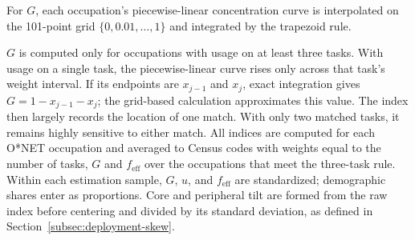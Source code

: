 \documentclass[12pt]{article}
\theoremstyle{plain}
\theoremstyle{definition}
\theoremstyle{remark}
\begin{document}
For $G$, each occupation's piecewise-linear concentration curve is
interpolated on the 101-point grid
$\{0,0.01,\ldots,1\}$ and integrated by the trapezoid rule.

$G$ is computed only for occupations with usage on at least three tasks.
With usage on a single task, the piecewise-linear curve rises only
across that task's weight interval. If its endpoints are $x_{j-1}$ and
$x_j$, exact integration gives $G=1-x_{j-1}-x_j$; the grid-based
calculation approximates this value. The index then largely records
the location of one match. With only two matched tasks, it remains
highly sensitive to either match. All
indices are computed for each O*NET occupation and averaged to Census
codes with weights equal to the number of tasks, $G$ and
$f_{\mathrm{eff}}$ over the occupations that meet the three-task rule.
Within each estimation sample, $G$, $u$, and $f_{\mathrm{eff}}$ are
standardized; demographic shares enter as proportions. Core and
peripheral tilt are formed from the raw index before centering and
divided by its standard deviation, as defined in
Section~\ref{subsec:deployment-skew}.
\end{document}
